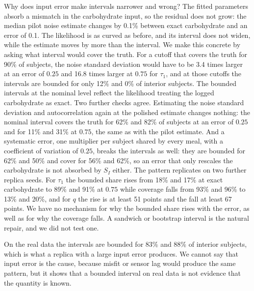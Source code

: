 \documentclass[letterpaper]{article} %
\newcommand{\figFinalCoverQQuarter}{82}
\newcommand{\figFinalCoverQThreeQuarter}{31}
\newcommand{\figFinalCoverTauQuarter}{62}
\newcommand{\figFinalCoverTauThreeQuarter}{11}
\newcommand{\figSeedMinDropQ}{67}
\newcommand{\figSeedMinRiseQ}{51}
\newcommand{\figSeedOneTauBoundedHigh}{89}
\newcommand{\figSeedOneTauBoundedZero}{18}
\newcommand{\figSeedOneTauCoverHigh}{13}
\newcommand{\figSeedOneTauCoverZero}{93}
\newcommand{\figSeedTwoTauBoundedHigh}{91}
\newcommand{\figSeedTwoTauBoundedZero}{17}
\newcommand{\figSeedTwoTauCoverHigh}{20}
\newcommand{\figSeedTwoTauCoverZero}{96}
\newcommand{\figSweepCalBoundedTauQuarter}{12}
\newcommand{\figSweepCalBoundedTauThreeQuarter}{0}
\newcommand{\figSweepSigmaChangePct}{0.1}
\newcommand{\figSweepSigmaTauQuarter}{3.4}
\newcommand{\figSweepSigmaTauThreeQuarter}{16.8}
\newcommand{\figSysBoundedQ}{50}
\newcommand{\figSysBoundedTau}{62}
\newcommand{\figSysCoverQ}{62}
\newcommand{\figSysCoverTau}{56}
\newcommand{\resPolishedBoundedPTrace}{88}
\newcommand{\resPolishedBoundedTauTrace}{83}
\begin{document}
Why does input error make intervals narrower and wrong? The fitted parameters absorb a mismatch in the carbohydrate input, so the residual does not grow: the median pilot noise estimate changes by \figSweepSigmaChangePct\% between exact carbohydrate and an error of 0.1. The likelihood is as curved as before, and its interval does not widen, while the estimate moves by more than the interval. We make this concrete by asking what interval would cover the truth. For a cutoff that covers the truth for 90\% of subjects, the noise standard deviation would have to be \figSweepSigmaTauQuarter{} times larger at an error of $0.25$ and \figSweepSigmaTauThreeQuarter{} times larger at $0.75$ for $\tau_1$, and at those cutoffs the intervals are bounded for only \figSweepCalBoundedTauQuarter\% and \figSweepCalBoundedTauThreeQuarter\% of interior subjects. The bounded intervals at the nominal level reflect the likelihood treating the logged carbohydrate as exact. Two further checks agree. Estimating the noise standard deviation and autocorrelation again at the polished estimate changes nothing: the nominal interval covers the truth for \figFinalCoverTauQuarter\% and \figFinalCoverQQuarter\% of subjects at an error of $0.25$ and for \figFinalCoverTauThreeQuarter\% and \figFinalCoverQThreeQuarter\% at $0.75$, the same as with the pilot estimate. And a systematic error, one multiplier per subject shared by every meal, with a coefficient of variation of $0.25$, breaks the intervals as well: they are bounded for \figSysBoundedTau\% and \figSysBoundedQ\% and cover for \figSysCoverTau\% and \figSysCoverQ\%, so an error that only rescales the carbohydrate is not absorbed by $S_I$ either. The pattern replicates on two further replica seeds. For $\tau_1$ the bounded share rises from \figSeedOneTauBoundedZero\% and \figSeedTwoTauBoundedZero\% at exact carbohydrate to \figSeedOneTauBoundedHigh\% and \figSeedTwoTauBoundedHigh\% at $0.75$ while coverage falls from \figSeedOneTauCoverZero\% and \figSeedTwoTauCoverZero\% to \figSeedOneTauCoverHigh\% and \figSeedTwoTauCoverHigh\%, and for $q$ the rise is at least \figSeedMinRiseQ{} points and the fall at least \figSeedMinDropQ{} points. We have no mechanism for why the bounded share rises with the error, as well as for why the coverage falls. A sandwich or bootstrap interval is the natural repair, and we did not test one.

On the real data the intervals are bounded for \resPolishedBoundedTauTrace\% and \resPolishedBoundedPTrace\% of interior subjects, which is what a replica with a large input error produces. We cannot say that input error is the cause, because misfit or sensor lag would produce the same pattern, but it shows that a bounded interval on real data is not evidence that the quantity is known.
\end{document}

